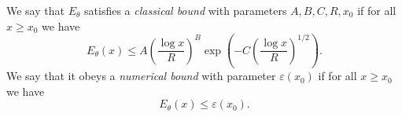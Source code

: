 \begin{definition}
\label{classical-bound-theta}
\leanok
We say that $E_\theta$ satisfies a \emph{classical bound}
  with parameters $A, B, C, R, x_0$ if for all
  $x \geq x_0$ we have
  \[ E_\theta(x) \leq A \left(\frac{\log x}{R}\right)^B
     \exp\left(-C \left(\frac{\log x}{R}\right)^{1/2}
     \right). \]
  We say that it obeys a \emph{numerical bound} with
  parameter $\varepsilon(x_0)$ if for all $x \geq x_0$
  we have
  \[ E_\theta(x) \leq \varepsilon(x_0). \]
\end{definition}
